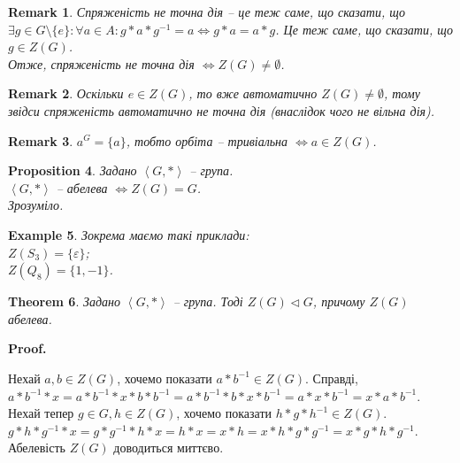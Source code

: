 \documentclass[a4paper, 10pt]{article}
\makeatletter
\theoremstyle{theoremdd}
\newtheorem{theorem}{Theorem}[subsection]
\theoremstyle{theoremdd}
\theoremstyle{theoremdd}
\theoremstyle{theoremdd}
\theoremstyle{theoremdd}
\newtheorem{example}[theorem]{Example}
\theoremstyle{theoremdd}
\theoremstyle{theoremdd}
\theoremstyle{theoremdd}
\theoremstyle{theoremdd}
\newtheorem{proposition}[theorem]{Proposition}
\theoremstyle{theoremdd}
\theoremstyle{theoremdd}
\newtheorem{remark}[theorem]{Remark}
\theoremstyle{theoremdd}
\theoremstyle{theoremdd}
\theoremstyle{theoremdd}
\theoremstyle{theoremdd}
\renewenvironment{proof}[1][Proof.\\]{\par
\pushQED{\hfill \qed}%
\normalfont \topsep6\p@\@plus6\p@\relax
\trivlist
\item\relax
{\bfseries
#1\@addpunct{.}}\hspace\labelsep\ignorespaces
}{%
\popQED\endtrivlist\@endpefalse
}
\makeatother
\begin{document}
\begin{remark}
Спряженість не точна дія -- це теж саме, що сказати, що $\exists g \in G \setminus \{e\}: \forall a \in A: g*a*g^{-1} = a \iff g*a=a*g$. Це теж саме, що сказати, що $g \in Z(G)$.\\
Отже, спряженість не точна дія $\iff Z(G) \neq \emptyset$.
\end{remark}

\begin{remark}
Оскільки $e \in Z(G)$, то вже автоматично $Z(G) \neq \emptyset$, тому звідси спряженість автоматично не точна дія (внаслідок чого не вільна дія).
\end{remark}

\begin{remark}
$a^G = \{a\}$, тобто орбіта -- тривіальна $\iff a \in Z(G)$.
\end{remark}

\begin{proposition}
Задано $\left< G,*\right>$ -- група.\\
$\left< G,*\right>$ -- абелева $\iff Z(G) = G$.\\
\textit{Зрозуміло.}
\end{proposition}

\iffalse
\begin{proposition}
Задано $\left< G,*\right>$ - група.\\
$a \in G$ - центральний елемент $\iff \text{card}(C_G(a)) = 1$.
\end{proposition}

\begin{proof}
$a \in Z(G) \iff a*g = g*a, \forall g \in G \iff g^{-1}*a*g=a, \forall g \in G \iff C_G(a) = \{a\} \iff \text{card}(C_G(a)) = 1$.
\end{proof}
\fi

\begin{example}
Зокрема маємо такі приклади:\\
$Z(S_3) = \{\varepsilon\}$;\\
$Z(Q_8) = \{1,-1\}$.
\end{example}

\begin{theorem}
Задано $\left< G,*\right>$ -- група. Тоді $Z(G) \triangleleft G$, причому $Z(G)$ абелева.
\end{theorem}

\begin{proof}
Нехай $a,b \in Z(G)$, хочемо показати $a*b^{-1} \in Z(G)$. Справді,\\
$a*b^{-1}*x = a*b^{-1}*x*b*b^{-1} = a*b^{-1}*b*x*b^{-1}= a*x*b^{-1} = x*a*b^{-1}$.\\
Нехай тепер $g \in G, h \in Z(G)$, хочемо показати $h*g*h^{-1} \in Z(G)$.\\ $g*h*g^{-1}*x = g*g^{-1}*h*x = h*x = x*h = x*h*g*g^{-1} = x*g*h*g^{-1}$.\\
Абелевість $Z(G)$ доводиться миттєво.
\end{proof}
\end{document}
